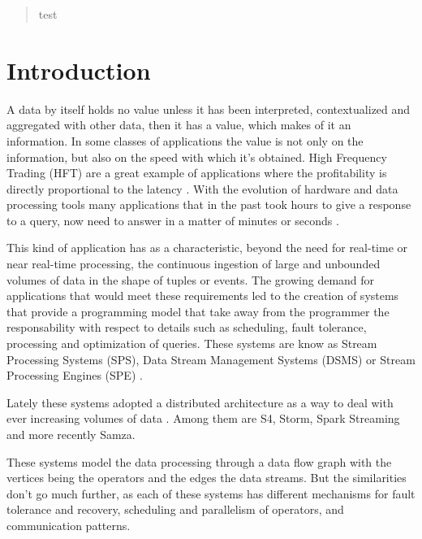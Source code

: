 \documentclass[ppgc,diss,english]{iiufrgs}
\begin{document}
\begin{abstract}
test
\end{abstract}


\chapter{Introduction}


A data by itself holds no value unless it has been interpreted, contextualized and aggregated with other data, then it has a value, which makes of it an information. In some classes of applications the value is not only on the information, but also on the speed with which it's obtained. High Frequency Trading (HFT) are a great example of applications where the profitability is directly proportional to the latency \cite{Loveless:2013:OAH:2507771.2507780}. With the evolution of hardware and data processing tools many applications that in the past took hours to give a response to a query, now need to answer in a matter of minutes or seconds \cite{barlow2013real}. 

This kind of application has as a characteristic, beyond the need for real-time or near real-time processing, the continuous ingestion of large and unbounded volumes of data in the shape of tuples or events. The growing demand for applications that would meet these requirements led to the creation of systems that provide a programming model that take away from the programmer the responsability with respect to details such as scheduling, fault tolerance, processing and optimization of queries. These systems are know as Stream Processing Systems (SPS), Data Stream Management Systems (DSMS) \cite{chakravarthy2009stream} or Stream Processing Engines (SPE) \cite{abadi2005design}.

Lately these systems adopted a distributed architecture as a way to deal with ever increasing volumes of data \cite{zaharia2012discretized}. Among them are S4, Storm, Spark Streaming and more recently Samza.

These systems model the data processing through a data flow graph with the vertices being the operators and the edges the data streams. But the similarities don't go much further, as each of these systems has different mechanisms for fault tolerance and recovery, scheduling and parallelism of operators, and communication patterns.
\end{document}
